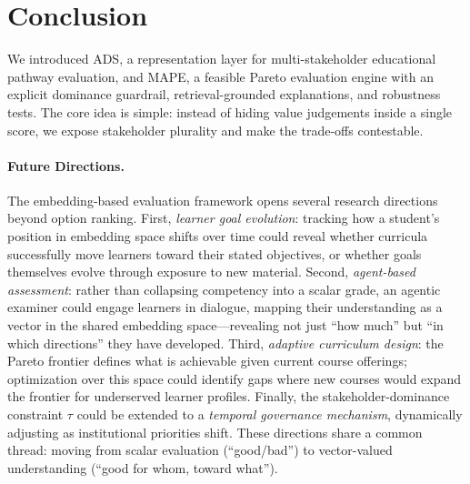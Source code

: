 \documentclass[sigconf,review]{acmart}
\newcommand{\ADS}{\textsc{ADS}\xspace}
\newcommand{\MAPE}{\textsc{MAPE}\xspace}
\begin{document}
\section{Conclusion}
We introduced \ADS, a representation layer for multi-stakeholder educational pathway evaluation, and \MAPE, a feasible Pareto evaluation engine with an explicit dominance guardrail, retrieval-grounded explanations, and robustness tests. The core idea is simple: instead of hiding value judgements inside a single score, we expose stakeholder plurality and make the trade-offs contestable.

\paragraph{Future Directions.}
The embedding-based evaluation framework opens several research directions beyond option ranking. First, \emph{learner goal evolution}: tracking how a student's position in embedding space shifts over time could reveal whether curricula successfully move learners toward their stated objectives, or whether goals themselves evolve through exposure to new material. Second, \emph{agent-based assessment}: rather than collapsing competency into a scalar grade, an agentic examiner could engage learners in dialogue, mapping their understanding as a vector in the shared embedding space---revealing not just ``how much'' but ``in which directions'' they have developed. Third, \emph{adaptive curriculum design}: the Pareto frontier defines what is achievable given current course offerings; optimization over this space could identify gaps where new courses would expand the frontier for underserved learner profiles. Finally, the stakeholder-dominance constraint $\tau$ could be extended to a \emph{temporal governance mechanism}, dynamically adjusting as institutional priorities shift. These directions share a common thread: moving from scalar evaluation (``good/bad'') to vector-valued understanding (``good for whom, toward what'').





\appendix

\end{document}
